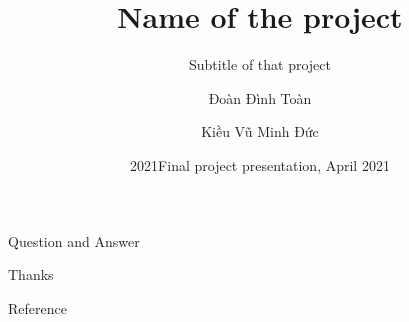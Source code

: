 \documentclass{beamer}
\date{2021}
\title[Intro2DS] %
{Name of the project}
\subtitle{Subtitle of that project}
\author[Đình Toàn, Minh Đức] %
{Đoàn Đình Toàn\inst{1} \and Kiều Vũ Minh Đức\inst{1}}
\institute[FIT-HCMUS] %
{
    \inst{1}%
    Faculty of Information Technology\\
    University Of Science

}
\date[\today] %
{Final project presentation, April 2021}
\begin{document}
\frame{\titlepage}



\begin{frame}
    \huge{\centerline{Question and Answer}}
\end{frame}

\begin{frame}
    \huge{\centerline{Thanks}}
\end{frame}

\begin{frame}{Reference}

    \cite{pham_2021}
    \printbibliography



\end{frame}
\end{document}
